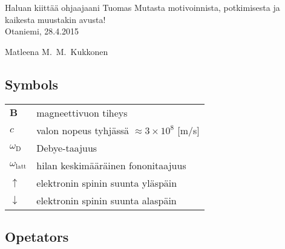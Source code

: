 \documentclass[english,12pt,a4paper,dvips]{article}
\begin{document}
Haluan kiittää ohjaajaani Tuomas Mutasta motivoinnista, potkimisesta ja kaikesta muustakin avusta!
\\

\vspace{5cm}
Otaniemi, 28.4.2015

\vspace{5mm}
{\hfill Matleena M.\ M.\ Kukkonen \hspace{1cm}}

\newpage

\thesistableofcontents




\subsection*{Symbols} 

\begin{tabular}{ll}
$\mathbf{B}$  & magneettivuon tiheys  \\
$c$              & valon nopeus tyhjässä $\approx 3\times10^8$ [m/s]\\
$\omega_{\mathrm{D}}$    & Debye-taajuus \\
$\omega_{\mathrm{latt}}$ & hilan keskimääräinen fononitaajuus \\
$\uparrow$       & elektronin spinin suunta yläspäin\\
$\downarrow$     & elektronin spinin suunta alaspäin
\end{tabular}


\subsection*{Opetators}
\end{document}
